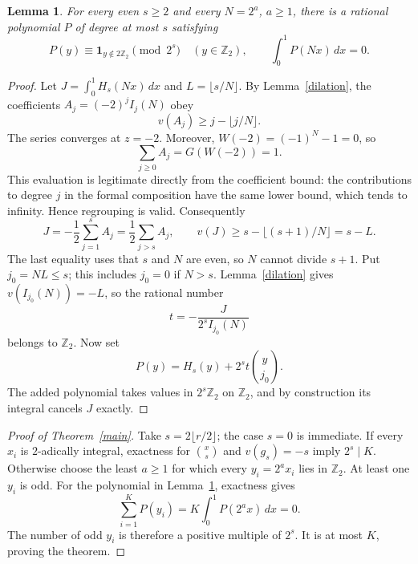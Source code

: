 \documentclass[11pt]{article}
\newtheorem{lemma}[theorem]{Lemma}
\newcommand{\Z}{\mathbb Z}
\begin{document}
\begin{lemma}\label{filter}
For every even $s\ge2$ and every $N=2^a$, $a\ge1$, there is a rational
polynomial $P$ of degree at most $s$ satisfying
\[
 P(y)\equiv\boldsymbol1_{y\notin2\Z_2}\pmod{2^s}
 \quad(y\in\Z_2),
 \qquad \int_0^1P(Nx)\,dx=0.
\]
\end{lemma}
\begin{proof}
Let $J=\int_0^1H_s(Nx)\,dx$ and $L=\lfloor s/N\rfloor$.
By Lemma~\ref{dilation}, the coefficients
$A_j=(-2)^jI_j(N)$ obey
\[
 v(A_j)\ge j-\lfloor j/N\rfloor.
\]
The series converges at $z=-2$. Moreover,
$W(-2)=(-1)^N-1=0$, so
\[
 \sum_{j\ge0}A_j=G(W(-2))=1.
\]
This evaluation is legitimate directly from the coefficient bound:
the contributions to degree $j$ in the formal composition have the same
lower bound, which tends to infinity. Hence regrouping is valid.
Consequently
\[
 J=-\frac12\sum_{j=1}^s A_j
   =\frac12\sum_{j>s}A_j,
 \qquad
 v(J)\ge s-\lfloor(s+1)/N\rfloor=s-L.
\]
The last equality uses that $s$ and $N$ are even, so $N$ cannot divide
$s+1$. Put $j_0=NL\le s$; this includes $j_0=0$ if $N>s$.
Lemma~\ref{dilation} gives $v(I_{j_0}(N))=-L$, so the rational number
\[
 t=-\frac{J}{2^sI_{j_0}(N)}
\]
belongs to $\Z_2$. Now set
\[
 P(y)=H_s(y)+2^st\binom y{j_0}.
\]
The added polynomial takes values in $2^s\Z_2$ on $\Z_2$, and by
construction its integral cancels $J$ exactly.
\end{proof}

\begin{proof}[Proof of Theorem~\ref{main}]
Take $s=2\lfloor r/2\rfloor$; the case $s=0$ is immediate.
If every $x_i$ is $2$-adically integral, exactness for
$\binom{x}{s}$ and $v(g_s)=-s$ imply $2^s\mid K$.
Otherwise choose the least $a\ge1$ for which every
$y_i=2^a x_i$ lies in $\Z_2$. At least one $y_i$ is odd.
For the polynomial in Lemma~\ref{filter}, exactness gives
\[
 \sum_{i=1}^K P(y_i)=K\int_0^1P(2^a x)\,dx=0.
\]
The number of odd $y_i$ is therefore a positive multiple of $2^s$.
It is at most $K$, proving the theorem.
\end{proof}
\end{document}
